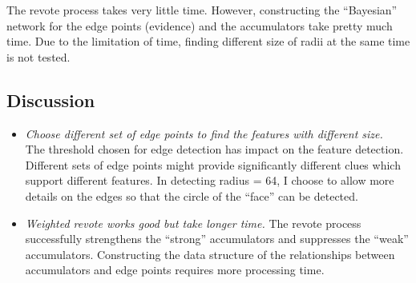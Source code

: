 \documentclass[paper=a4, fontsize=11pt]{scrartcl}
\begin{document}
The revote process takes very little time. 
However, constructing the ``Bayesian'' network for the edge points (evidence) and the accumulators take pretty much time.
Due to the limitation of time, finding different size of radii at the same time is not tested.

\subsection{Discussion}

\begin{itemize}
\item \emph{ Choose different set of edge points to find the features with different size. } \\
The threshold chosen for edge detection has impact on the feature detection. 
Different sets of edge points might provide significantly different clues which support different features.
In detecting radius = 64, I choose to allow more details on the edges so that the circle of the ``face'' can be detected.
\item \emph{ Weighted revote works good but take longer time. } 
The revote process successfully strengthens the ``strong'' accumulators and suppresses the ``weak'' accumulators.
Constructing the data structure of the relationships between accumulators and edge points requires more processing time.
\end{itemize}
\end{document}
